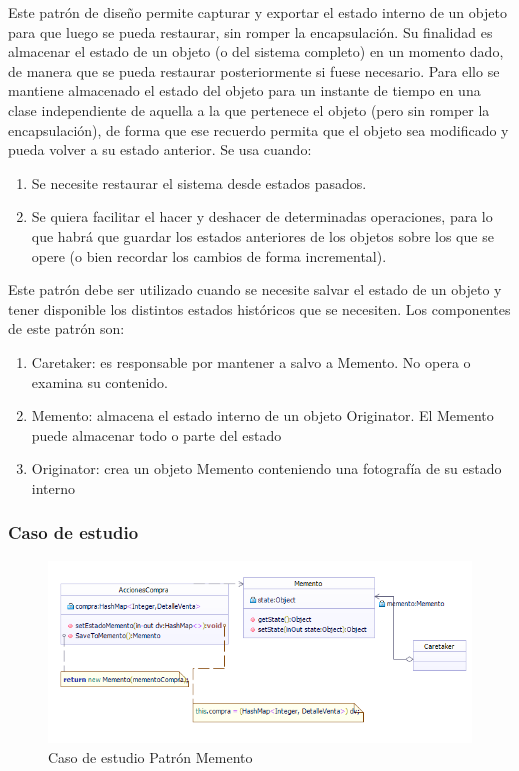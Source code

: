Este patrón de diseño permite capturar y exportar el estado interno de un objeto para que luego se pueda restaurar, sin romper la encapsulación.
Su finalidad es almacenar el estado de un objeto (o del sistema completo) en un momento dado, de manera que se pueda restaurar posteriormente si fuese necesario. Para ello se mantiene almacenado el estado del objeto para un instante de tiempo en una clase independiente de aquella a la que pertenece el objeto (pero sin romper la encapsulación), de forma que ese recuerdo permita que el objeto sea modificado y pueda volver a su estado anterior.
\newline
Se usa cuando:
\begin{enumerate}
	\item Se necesite restaurar el sistema desde estados pasados.
	\item Se quiera facilitar el hacer y deshacer de determinadas operaciones, para lo que habrá que guardar los estados anteriores de los objetos sobre los que se opere (o bien recordar los cambios de forma incremental).
\end{enumerate}
Este patrón debe ser utilizado cuando se necesite salvar el estado de un objeto y tener disponible los distintos estados históricos que se necesiten.
\newline
Los componentes de este patrón son:
\begin{enumerate}
	\item Caretaker: es responsable por mantener a salvo a Memento. No opera o examina su contenido.
	\item Memento: almacena el estado interno de un objeto Originator. El Memento puede almacenar todo o parte del estado
	\item Originator: crea un objeto Memento conteniendo una fotografía de su estado interno
\end{enumerate}
\newpage
\subsubsection{Caso de estudio}
\begin{figure}[h!]
	\centering
	\includegraphics[width=0.7\linewidth]{arquitectura/imagenes/PatronMementoCasoEstudio}
	\caption{Caso de estudio Patrón Memento}
	\label{fig:Caso de estudio Patrón Memento}
\end{figure}

